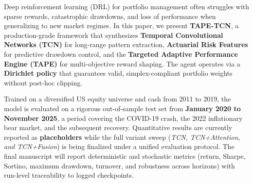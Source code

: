 Deep reinforcement learning (DRL) for portfolio management often struggles with sparse rewards, catastrophic drawdowns, and loss of performance when generalizing to new market regimes. 
In this paper, we present \textbf{TAPE-TCN}, a production-grade framework that synthesizes \textbf{Temporal Convolutional Networks (TCN)} for long-range pattern extraction, \textbf{Actuarial Risk Features} for predictive drawdown control, and the \textbf{Targeted Adaptive Performance Engine (TAPE)} for multi-objective reward shaping. 
The agent operates via a \textbf{Dirichlet policy} that guarantees valid, simplex-compliant portfolio weights without post-hoc clipping.

Trained on a diversified US equity universe and cash from 2011 to 2019, the model is evaluated on a rigorous out-of-sample test set from \textbf{January 2020 to November 2025}, a period covering the COVID-19 crash, the 2022 inflationary bear market, and the subsequent recovery.
Quantitative results are currently reported as \textbf{placeholders} while the full variant sweep (\textit{TCN, TCN+Attention, and TCN+Fusion}) is being finalized under a unified evaluation protocol.
The final manuscript will report deterministic and stochastic metrics (return, Sharpe, Sortino, maximum drawdown, turnover, and robustness across horizons) with run-level traceability to logged checkpoints.
